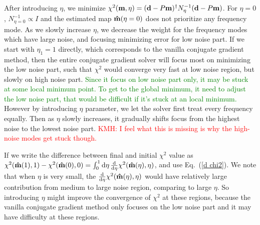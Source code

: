 \documentclass[twocolumn,linenumbers]{aastex631}
\newcommand{\vbd}{\vb{d}}
\newcommand{\vbm}{\vb{m}}
\newcommand{\inv}[1]{#1^{-1}}
\newcommand{\hatm}{\vb{\hat{m}}}
\newcommand{\Nbar}{\bar{N}}
\newcommand{\Neta}{N_{\eta}}
\newcommand{\kmh}[1]{\textcolor{red}{KMH: #1}}
\begin{document}
After introducing $\eta$, we minimize
$\chi^2(\vbm,\eta)=(\vbd-P\vbm)^{\dagger} N_{\eta}^{-1} (\vbd - P\vbm)$.
For $\eta=0$, $N^{-1}_{\eta=0} \propto I$ and the estimated map $\hatm(\eta=0)$
does not prioritize any frequency mode.
As we slowly increase $\eta$, we decrease the weight for the frequency modes
which have large noise, and focusing minimizing error for low noise part.
If we start with $\eta_1=1$ directly, which corresponds to the vanilla conjugate
gradient method, then the entire conjugate gradient solver
will focus most on minimizing the low noise part, such that $\chi^2$ would
converge very fast at low noise region, but slowly on high noise part.
\textcolor{green}{
Since it focus on low noise part only, it may be stuck at some local minimum point.
To get to the global minimum, it need to adjust the low noise part, that would
be difficult if it's stuck at an local minimum.
}
However by introducing $\eta$ parameter, we let the solver first treat every
frequency equally.
Then as $\eta$ slowly increases, it gradually shifts focus from the highest noise to the lowest noise
part.  \kmh{I feel what this is missing is why the high-noise modes get stuck though.}


If we write the difference between final and initial $\chi^2$ value as
$\chi^2(\hatm(1),1) - \chi^2(\hatm(0),0) = \int_0^1 \dd{\eta}
\dv{\eta} \chi^2(\hatm(\eta),\eta)$,
and use Eq.~(\ref{d chi2}).
We note that when $\eta$ is very small, 
the $\dv{\eta}\chi^2(\hatm(\eta),\eta)$ would have relatively large
contribution from medium to large noise region, comparing to large $\eta$.
So introducing $\eta$ might improve the convergence of $\chi^2$ at these
regions, because the vanilla conjugate gradient method only focuses on the low noise
part and it may have difficulty at these regions.
\end{document}
